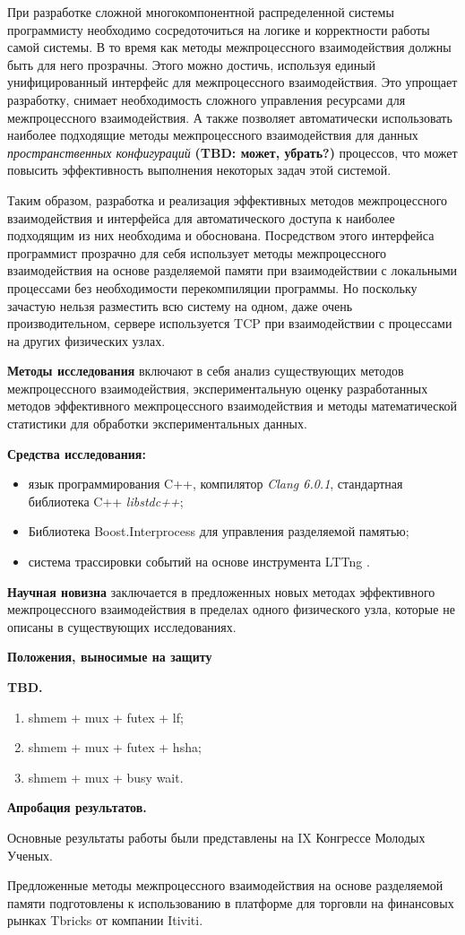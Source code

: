 При разработке сложной многокомпонентной распределенной системы программисту необходимо сосредоточиться на логике и корректности работы самой системы. В то время как методы межпроцессного взаимодействия должны быть для него прозрачны. Этого можно достичь, используя единый унифицированный интерфейс для межпроцессного взаимодействия. Это упрощает разработку, снимает необходимость сложного управления ресурсами для межпроцессного взаимодействия. А также позволяет автоматически использовать наиболее подходящие методы межпроцессного взаимодействия для данных \textit{пространственных конфигураций}
\textbf{(TBD: может, убрать?)}
процессов, что может повысить эффективность выполнения некоторых задач этой системой.

Таким образом, разработка и реализация эффективных методов межпроцессного взаимодействия и интерфейса для автоматического доступа к наиболее подходящим из них необходима и обоснована. Посредством этого интерфейса программист прозрачно для себя использует методы межпроцессного взаимодействия на основе разделяемой памяти при взаимодействии с локальными процессами без необходимости перекомпиляции программы. Но поскольку зачастую нельзя разместить всю систему на одном, даже очень производительном, сервере используется TCP при взаимодействии с процессами на других физических узлах.

\textbf{Методы исследования} включают в себя анализ существующих методов межпроцессного взаимодействия, экспериментальную оценку разработанных методов эффективного межпроцессного взаимодействия и методы математической статистики для обработки экспериментальных данных.

\textbf{Средства исследования:}
\begin{itemize}
\item язык программирования C++, компилятор \textit{Clang 6.0.1}, стандартная библиотека C++ \textit{libstdc++};
\item Библиотека Boost.Interprocess \cite{BoostInterprocess} для управления разделяемой памятью;
\item система трассировки событий \cite{LTTngThesis} на основе инструмента LTTng \cite{LTTngSite}.
\end{itemize}

\textbf{Научная новизна} заключается в предложенных новых методах эффективного межпроцессного взаимодействия в пределах одного физического узла, которые не описаны в существующих исследованиях.

\textbf{Положения, выносимые на защиту}

\textbf{TBD.}
\begin{enumerate}
\item shmem + mux + futex + lf;
\item shmem + mux + futex + hsha;
\item shmem + mux + busy wait.
\end{enumerate}


\textbf{Апробация результатов.}

Основные результаты работы были представлены на IX Конгрессе Молодых Ученых.

Предложенные методы межпроцессного взаимодействия на основе разделяемой памяти подготовлены к использованию в платформе для торговли на финансовых рынках Tbricks от компании Itiviti.
